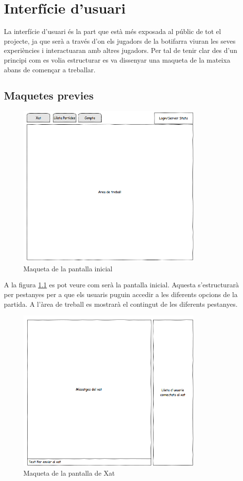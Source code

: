\chapter{Interfície d'usuari}
\label{chap:interficie_usuari}

La interfície d'usuari és la part que està més exposada al públic de tot el projecte, ja que serà a través d'on els jugadors de la botifarra viuran les seves experiències i interactuaran amb altres jugadors. Per tal de tenir clar des d'un principi com es volia estructurar es va dissenyar una maqueta de la mateixa abans de començar a treballar. 

\section{Maquetes previes}

\begin{figure}[htbp]
\centering\includegraphics{img/Inici.png}
\caption{Maqueta de la pantalla inicial}
\label{fig:mookup-inici}
\end{figure} 

A la figura \ref{fig:mookup-inici} es pot veure com serà la pantalla inicial. Aquesta s'estructurarà per pestanyes per a que els usuaris puguin accedir a les diferents opcions de la partida. A l'àrea de treball es mostrarà el contingut de les diferents pestanyes. 

\begin{figure}[htbp]
\centering\includegraphics{img/Xat.png}
\caption{Maqueta de la pantalla de Xat}
\label{fig:mookup-xat}
\end{figure} 

